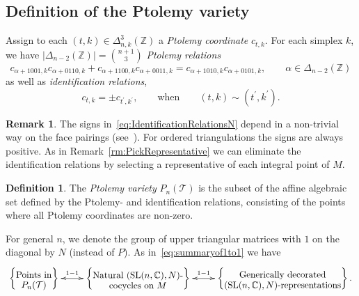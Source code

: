 \documentclass[12pt]{amsart}
\theoremstyle{definition}
\newtheorem{definition}[theorem]{Definition}
\newtheorem{remark}[theorem]{Remark}
\numberwithin{equation}{section}
\def\SL{\mathrm{SL}}
\def\Z{\mathbb{Z}}
\def\C{\mathbb{C}}
\def\T{\mathcal{T}}
\begin{document}
\subsection{Definition of the Ptolemy variety}
Assign to each $(t,k)\in\Delta^3_{n,k}(\Z)$ a \emph{Ptolemy coordinate} $c_{t,k}$.
For each simplex $k$, we have $\vert\Delta_{n-2}(\Z)\vert=\binom{n+1}{3}$ \emph{Ptolemy relations}
\begin{equation}
c_{\alpha+1001,k}c_{\alpha+0110,k}+c_{\alpha+1100,k}c_{\alpha+0011,k}=c_{\alpha+1010,k}c_{\alpha+0101,k},
\qquad \alpha\in\Delta_{n-2}(\Z)
\end{equation}
as well as \emph{identification relations},
\begin{equation}\label{eq:IdentificationRelationsN}
c_{t,k}=\pm c_{t^{\prime},k^{\prime}},\qquad\text{when}\qquad (t,k)\sim (t^{\prime},k^{\prime}).
\end{equation}
\begin{remark}The signs in~\ref{eq:IdentificationRelationsN} depend in a non-trivial way on the face pairings (see~\cite{GaroufalidisGoernerZickert}). For ordered triangulations the signs are always positive. As in Remark~\ref{rm:PickRepresentative} we can eliminate the identification relations by selecting a representative of each integral point of $M$.
\end{remark}
\begin{definition} The \emph{Ptolemy variety} $P_n(\T)$ is the subset of the affine algebraic set defined by the Ptolemy- and identification relations, consisting of the points where all Ptolemy coordinates are non-zero.
\end{definition}
For general $n$, we denote the group of upper triangular matrices with $1$ on the diagonal by $N$ (instead of $P$). As in~\ref{eq:summaryof1to1} we have %
\begin{equation}\label{eq:summaryof1to1GeneralN}
\xymatrix{\left\{\txt{Points in\\$P_n(\T)$}\right\}\ar@{<->}[r]^-{1-1}&\left\{\txt{Natural $(\SL(n,\C),N)$-\\cocycles on $M$}\right\}\ar@{<->}[r]^-{1-1}&\left\{\txt{Generically decorated\\
$(\SL(n,\C),N)$-representations}\right\}.}
\end{equation}
\end{document}
